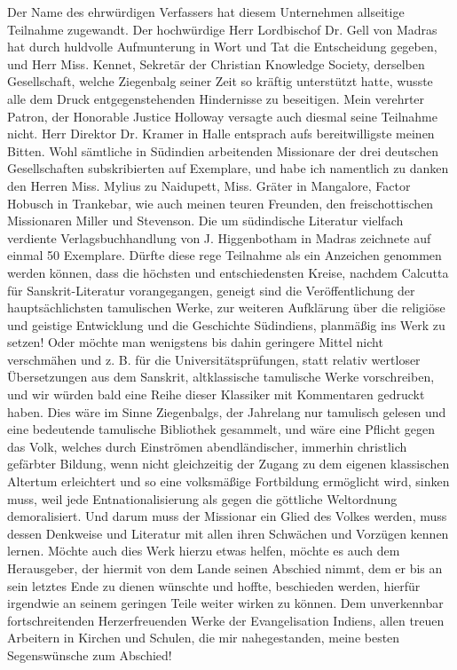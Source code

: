 \documentclass{article}
\begin{document}
Der Name des ehrwürdigen Verfassers hat diesem Unternehmen allseitige Teilnahme zugewandt. Der hochwürdige Herr Lordbischof Dr. Gell von Madras hat durch huldvolle Aufmunterung in Wort und Tat die Entscheidung gegeben, und Herr Miss. Kennet, Sekretär der Christian Knowledge Society, derselben Gesellschaft, welche Ziegenbalg seiner Zeit so kräftig unterstützt hatte, wusste alle dem Druck entgegenstehenden Hindernisse zu beseitigen. Mein verehrter Patron, der Honorable Justice Holloway versagte auch diesmal seine Teilnahme nicht. Herr Direktor Dr. Kramer in Halle entsprach aufs bereitwilligste meinen Bitten. Wohl sämtliche in Südindien arbeitenden Missionare der drei deutschen Gesellschaften subskribierten auf Exemplare, und habe ich namentlich zu danken den Herren Miss. Mylius zu Naidupett, Miss. Gräter in Mangalore, Factor Hobusch in Trankebar, wie auch meinen teuren Freunden, den freischottischen Missionaren Miller und Stevenson. Die um südindische Literatur vielfach verdiente Verlagsbuchhandlung von J. Higgenbotham in Madras zeichnete auf einmal 50 Exemplare.
\clearpage
Dürfte diese rege Teilnahme als ein Anzeichen genommen werden können, dass die höchsten und entschiedensten Kreise, nachdem Calcutta für Sanskrit-Literatur vorangegangen, geneigt sind die Veröffentlichung der hauptsächlichsten tamulischen Werke, zur weiteren Aufklärung über die religiöse und geistige Entwicklung und die Geschichte Südindiens, planmäßig ins Werk zu setzen! Oder möchte man wenigstens bis dahin geringere Mittel nicht verschmähen und z. B. für die Universitätsprüfungen, statt relativ wertloser Übersetzungen aus dem Sanskrit, altklassische tamulische Werke vorschreiben, und wir würden bald eine Reihe dieser Klassiker mit Kommentaren gedruckt haben. Dies wäre im Sinne Ziegenbalgs, der Jahrelang nur tamulisch gelesen und eine bedeutende tamulische Bibliothek gesammelt, und wäre eine Pflicht gegen das Volk, welches durch Einströmen abendländischer, immerhin christlich gefärbter Bildung, wenn nicht gleichzeitig der Zugang zu dem eigenen klassischen Altertum erleichtert und so eine volksmäßige Fortbildung ermöglicht wird, sinken muss, weil jede Entnationalisierung als gegen die göttliche Weltordnung demoralisiert. Und darum muss der Missionar ein Glied des Volkes werden, muss dessen Denkweise und Literatur mit allen ihren Schwächen und Vorzügen kennen lernen. Möchte auch dies Werk hierzu etwas helfen, möchte es auch dem Herausgeber, der hiermit von dem Lande seinen Abschied nimmt, dem er bis an sein letztes Ende zu dienen wünschte und hoffte, beschieden werden, hierfür irgendwie an seinem geringen Teile weiter wirken zu können. Dem unverkennbar fortschreitenden Herzerfreuenden Werke der Evangelisation Indiens, allen treuen Arbeitern in Kirchen und Schulen, die mir nahegestanden, meine besten Segenswünsche zum Abschied!
\end{document}
